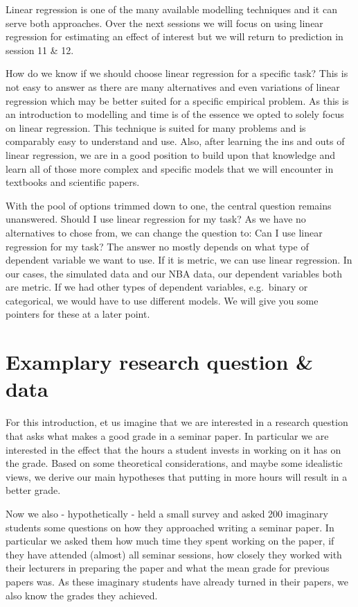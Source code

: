 \documentclass[
]{book}
\begin{document}
Linear regression is one of the many available modelling techniques and it can
serve both approaches. Over the next sessions we will focus on using
linear regression for estimating an effect of interest but we will return to
prediction in session 11 \& 12.

How do we know if we should choose linear regression for a specific task?
This is not easy to answer as there are many alternatives and even variations of
linear regression which may be better suited for a specific empirical problem.
As this is an introduction to modelling and time is of the essence we opted to
solely focus on linear regression. This technique is suited for many problems and
is comparably easy to understand and use. Also, after learning the ins and outs
of linear regression, we are in a good position to build upon that knowledge and
learn all of those more complex and specific models that we will encounter in
textbooks and scientific papers.

With the pool of options trimmed down to one, the central question remains unanswered.
Should I use linear regression for my task? As we have no alternatives to chose
from, we can change the question to: Can I use linear regression for my task?
The answer no mostly depends on what type of dependent variable we want to use.
If it is metric, we can use linear regression. In our cases, the simulated data
and our NBA data, our dependent variables both are metric. If we had other types
of dependent variables, e.g.~binary or categorical, we would have to use different
models. We will give you some pointers for these at a later point.

\hypertarget{examplary-research-question-data}{%
\section{Examplary research question \& data}\label{examplary-research-question-data}}

For this introduction, et us imagine that we are interested in a research
question that asks what makes a good grade in a seminar paper. In particular we
are interested in the effect that the hours a student invests in working on it
has on the grade. Based on some theoretical considerations, and maybe some
idealistic views, we derive our main hypotheses that putting in more hours will
result in a better grade.

Now we also - hypothetically - held a small survey and asked 200 imaginary
students some questions on how they approached writing a seminar paper. In
particular we asked them how much time they spent working on the paper, if they
have attended (almost) all seminar sessions, how closely they worked with their
lecturers in preparing the paper and what the mean grade for previous papers
was. As these imaginary students have already turned in their papers, we also
know the grades they achieved.
\end{document}
